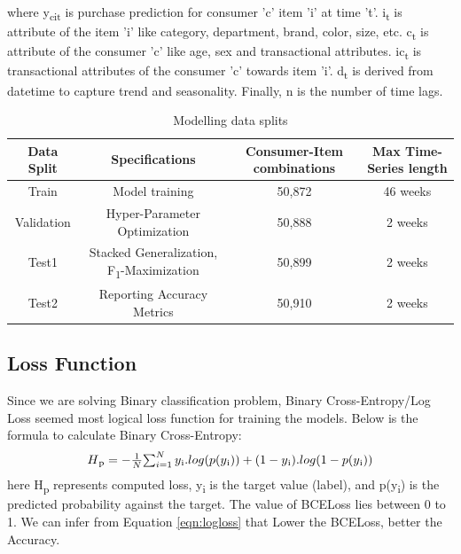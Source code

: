 where y\textsubscript{cit} is purchase prediction for consumer 'c' item ’i’ at time ’t’. 
i\textsubscript{t} is attribute of the item ’i’ like category, department, brand, color, size, etc. 
c\textsubscript{t} is attribute of the consumer 'c' like age, sex and transactional attributes. 
ic\textsubscript{t} is transactional attributes of the consumer 'c'  towards item 'i'. 
d\textsubscript{t} is derived from datetime to capture trend and seasonality. 
Finally, n is the number of time lags.
\begin{table}[t]
\caption{Modelling data splits}
\vspace{0.1 in}
\centering
\resizebox{3.3in}{!}
{%
\begin{tabular}{|c|c|c|c|}
\hline
{\bf Data Split} & {\bf Specifications} & {\bf Consumer-Item combinations} & {\bf Max Time-Series length} \\  
\hline\hline
Train  		&  Model training &  50,872 &  46 weeks \\ \hline
Validation	  		&  Hyper-Parameter Optimization &  50,888 &  2 weeks \\ \hline
Test1  		&  Stacked Generalization, F\textsubscript{1}-Maximization & 50,899 &  2 weeks\\ \hline
Test2	  		&  Reporting Accuracy Metrics & 50,910 &  2 weeks\\
\hline
\end{tabular}
}
\label{tab:datasplit}
\end{table}
\subsection{Loss Function}
Since we are solving Binary classification problem, Binary Cross-Entropy/Log Loss seemed most logical loss function 
for training the models. Below is the formula to calculate Binary Cross-Entropy:
  \begin{equation}
      \begin{array}{l}
        H\textsubscript{p} = - \frac{1}{N}$$\sum_{i=1}^{N}y\textsubscript{i}.log(p(y\textsubscript{i}))+
        (1- y\textsubscript{i}).log(1-p(y\textsubscript{i}))
      \end{array}
    \label{eqn:logloss}
  \end{equation}
here H\textsubscript{p} represents computed loss, y\textsubscript{i} is the target value (label), and p(y\textsubscript{i}) 
is the predicted probability against the target. The value of BCELoss lies between 0 to 1. We can infer 
from Equation \ref{eqn:logloss} that Lower the BCELoss, better the Accuracy.
